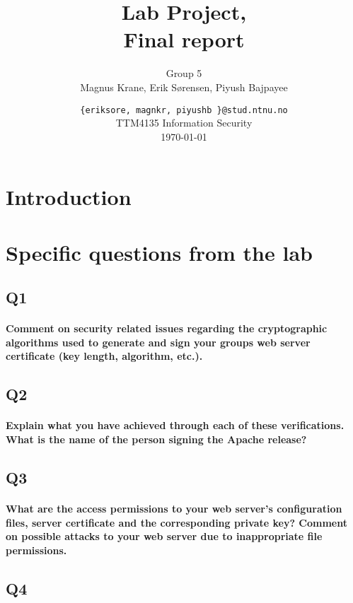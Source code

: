 \documentclass[a4paper,11pt]{article}
\title{Lab Project,\\Final report}
\author{Group 5 \\Magnus Krane, Erik S\o rensen, Piyush Bajpayee}
\date{ {\tt \{eriksore, magnkr, piyushb \}@stud.ntnu.no}\\
TTM4135 Information Security\\
\today}
\begin{document}
\maketitle
\vspace{3cm}

\begin{abstract}

\end{abstract}
\section*{Introduction}
\paragraph{} 
\section{Specific questions from the lab}
\subsection{Q1}
\paragraph{Comment on security related issues regarding the cryptographic algorithms used to
generate and sign your groups web server certiﬁcate (key length, algorithm, etc.).}
\subsection{Q2}
\paragraph{Explain what you have achieved through each of these veriﬁcations. What is the name of
the person signing the Apache release?}
\subsection{Q3}
\paragraph{What are the access permissions to your web server’s conﬁguration ﬁles, server certiﬁcate
and the corresponding private key? Comment on possible attacks to your web server due to
inappropriate ﬁle permissions.}
\subsection{Q4}
\end{document}
